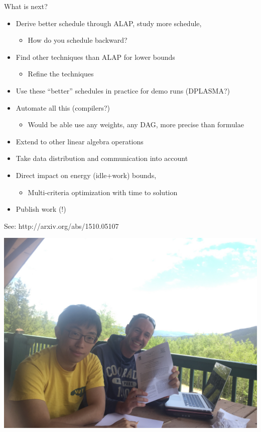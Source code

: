 \begin{frame}

What is next?
\begin{itemize}
\item Derive better schedule through ALAP, study more schedule, 
\begin{itemize}
\item How do you schedule backward?
\end{itemize}
\item Find other techniques than ALAP for lower bounds
\begin{itemize}
\item Refine the techniques
\end{itemize}
\item Use these ``better'' schedules in practice for demo runs (DPLASMA?)
\item Automate all this (compilers?)
\begin{itemize}
\item Would be able use any weights, any DAG, more precise than formulae
\end{itemize}
\item Extend to other linear algebra operations
\item Take data distribution and communication into account
\item Direct impact on energy (idle+work) bounds,
\begin{itemize}
\item Multi-criteria optimization with time to solution
\end{itemize}
\item Publish work (!)
\end{itemize}

See:
http://arxiv.org/abs/1510.05107

\end{frame}




\begin{frame}

\includegraphics[width=.50\textwidth]{willy.jpg}\\

\end{frame}


